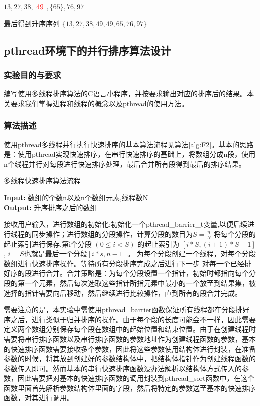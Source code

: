 \documentclass[supercite]{Experimental_Report}
\theoremstyle{definition}
\begin{document}
$13, 27, 38, $
$\color[rgb]{1,0,0}{49}$
$,\{65\}, 76, 97$

最后得到升序序列
$\{13, 27, 38, 49, 49, 65, 76, 97\}$


\subsection{pthread环境下的并行排序算法设计}
\subsubsection{实验目的与要求}
编写使用多线程排序算法的C语言小程序，并按要求输出对应的排序后的结果。本关要求我们掌握进程和线程的概念以及pthread的使用方法。
\subsubsection{算法描述}
使用pthread多线程并行执行快速排序的基本算法流程见算法\ref{alg:F2}。基本的思路是：使用pthread实现快速排序，在串行快速排序的基础上，将数组分成n段，使用n个线程并行对每段进行快速排序处理，最后合并所有段得到最后的排序结果。

\begin{algorithm}[htb]
\caption{多线程快速排序算法流程}
\label{alg:F2}
\hspace*{0.02in} {\bf Input:}
数组的个数n以及n个数组元素,线程数N\\
\hspace*{0.02in} {\bf Output:} 
升序排序之后的数组
\begin{algorithmic}[1]
\State 接收用户输入，进行数组的初始化;初始化一个pthread\_barrier\_t变量,以便后续进行线程的同步操作；进行数组的分段操作，计算分段的数目为$S=\frac{n}{N}$
\State 将每个分段的起止索引进行保存,第i个分段 $(0\leq i<S)$ 的起止索引为 $[i*S,(i+1)*S-1]$, $i=S$也就是最后一个分段$[i*s, n-1]$。
\State 为每个分段创建一个线程，对每个分段数组进行快速排序操作。等待所有分段排序完成之后进行下一步
\State 对每一个已经排好序的段进行合并。合并策略是：为每个分段设置一个指针，初始时都指向每个分段的第一个元素，然后每次选取这些指针所指元素中最小的一个放至到结果集，被选择的指针需要向后移动，然后继续进行比较操作，直到所有的段合并完成。
\end{algorithmic}
\end{algorithm}

需要注意的是，本实验中需使用pthread\_barrier函数保证所有线程都在分段排好序之后，进行类似于归并排序的操作。由于每个段的长度可能会不一样，因此需要定义两个数组分别保存每个段在数组中的起始位置和结束位置。由于在创建线程时需要将串行排序函数以及串行排序函数的参数地址作为创建线程函数的参数，基本的快速排序函数需要接收多个参数，因此将这些参数使用结构体进行封装，在准备参数的时候，将其放到创建好的参数结构体中，把结构体指针作为创建线程函数的参数传入即可。然而基本的串行快速排序函数没办法解析以结构体方式传入的参数，因此需要把对基本的快速排序函数的调用封装到pthread\_sort函数中，在这个函数里面首先解析参数结构体里面的字段，然后将特定的参数送至基本的快速排序函数，对其进行调用。
\end{document}
